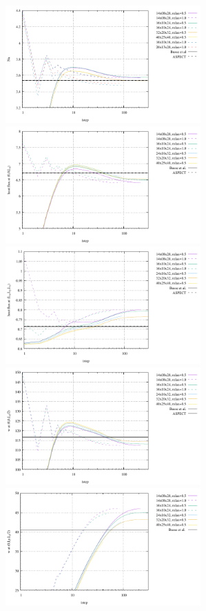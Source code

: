 \begin{center}
\includegraphics[width=7.5cm]{python_codes/fieldstone_20/results/Nu.pdf}\\
\includegraphics[width=7.5cm]{python_codes/fieldstone_20/results/hf1.pdf}
\includegraphics[width=7.5cm]{python_codes/fieldstone_20/results/hf2.pdf}\\
\includegraphics[width=7.5cm]{python_codes/fieldstone_20/results/wmid1.pdf}
\includegraphics[width=7.5cm]{python_codes/fieldstone_20/results/wmid2.pdf}
\end{center}

